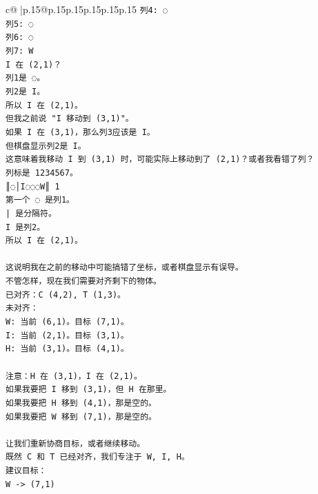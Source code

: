 \documentclass{article}
\begin{document}
{\begin{supertabular}{c@{$\;$}|p{.15\linewidth}@{}p{.15\linewidth}p{.15\linewidth}p{.15\linewidth}p{.15\linewidth}p{.15\linewidth}}
{{{\texttt{列4: ◌} \\
\texttt{列5: ◌} \\
\texttt{列6: ◌} \\
\texttt{列7: W} \\
\texttt{I 在 (2,1)？} \\
\texttt{列1是 ◌。} \\
\texttt{列2是 I。} \\
\texttt{所以 I 在 (2,1)。} \\
\texttt{但我之前说 "I 移动到 (3,1)"。} \\
\texttt{如果 I 在 (3,1)，那么列3应该是 I。} \\
\texttt{但棋盘显示列2是 I。} \\
\texttt{这意味着我移动 I 到 (3,1) 时，可能实际上移动到了 (2,1)？或者我看错了列？} \\
\texttt{列标是 1234567。} \\
\texttt{║◌│I◌◌◌W║ 1} \\
\texttt{第一个 ◌ 是列1。} \\
\texttt{| 是分隔符。} \\
\texttt{I 是列2。} \\
\texttt{所以 I 在 (2,1)。} \\
\\ 
\texttt{这说明我在之前的移动中可能搞错了坐标，或者棋盘显示有误导。} \\
\texttt{不管怎样，现在我们需要对齐剩下的物体。} \\
\texttt{已对齐：C (4,2), T (1,3)。} \\
\texttt{未对齐：} \\
\texttt{W: 当前 (6,1)。目标 (7,1)。} \\
\texttt{I: 当前 (2,1)。目标 (3,1)。} \\
\texttt{H: 当前 (3,1)。目标 (4,1)。} \\
\\ 
\texttt{注意：H 在 (3,1)，I 在 (2,1)。} \\
\texttt{如果我要把 I 移到 (3,1)，但 H 在那里。} \\
\texttt{如果我要把 H 移到 (4,1)，那是空的。} \\
\texttt{如果我要把 W 移到 (7,1)，那是空的。} \\
\\ 
\texttt{让我们重新协商目标，或者继续移动。} \\
\texttt{既然 C 和 T 已经对齐，我们专注于 W, I, H。} \\
\texttt{建议目标：} \\
\texttt{W {-}> (7,1)} \\
}}}
\end{supertabular}}
\end{document}
